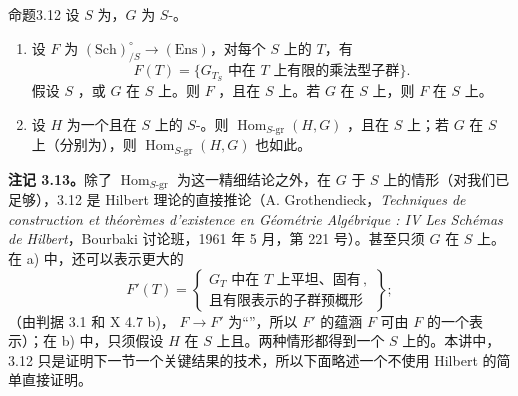 \begin{SGAresult}{命题}{3.12}
设 $S$ 为，$G$ 为 $S$-。
\begin{enumerate}
\item[a)] 设 $F$ 为 $(\mathrm{Sch})^\circ_{/S}\to(\mathrm{Ens})$，对每个 $S$ 上的 $T$，有
\[F(T)=\{G_{T_S}\text{ 中在 }T\text{ 上有限的乘法型子群}\}.\]
假设 $S$ ，或 $G$ 在 $S$ 上。则 $F$ ，且在 $S$ 上。若 $G$ 在 $S$ 上，则 $F$ 在 $S$ 上。
\item[b)] 设 $H$ 为一个且在 $S$ 上的 $S$-。则 $\operatorname{Hom}_{S\text{-gr}}(H,G)$ ，且在 $S$ 上；若 $G$ 在 $S$ 上（分别为），则 $\operatorname{Hom}_{S\text{-gr}}(H,G)$ 也如此。
\end{enumerate}
\end{SGAresult}
\textbf{注记 3.13。}除了 $\operatorname{Hom}_{S\text{-gr}}$ 为这一精细结论之外，在 $G$ 于 $S$ 上的情形（对我们已足够），3.12 是 Hilbert 理论的直接推论（A. Grothendieck，\emph{Techniques de construction et théorèmes d'existence en Géométrie Algébrique : IV Les Schémas de Hilbert}，Bourbaki 讨论班，1961 年 5 月，第 221 号）。甚至只须 $G$ 在 $S$ 上。在 a) 中，还可以表示更大的
\[F'(T)=\left\{\begin{array}{l}G_T\text{ 中在 }T\text{ 上平坦、固有}\,,\\\text{且有限表示的子群预概形}\end{array}\right\};\]
（由判据 3.1 和 X 4.7 b)， $F\to F'$ 为“”，所以 $F'$ 的蕴涵 $F$ 可由 $F$ 的一个表示）；在 b) 中，只须假设 $H$ 在 $S$ 上且。两种情形都得到一个 $S$ 上的。本讲中，3.12 只是证明下一节一个关键结果的技术，所以下面略述一个不使用 Hilbert 的简单直接证明。
